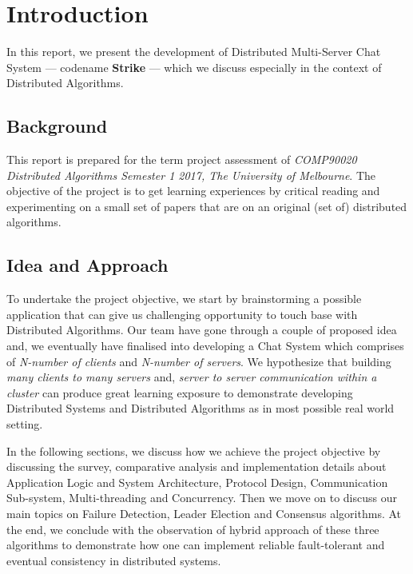 \documentclass[dareport.tex]{subfiles}
\begin{document}

\section{Introduction}
In this report, we present the development of Distributed Multi-Server Chat System --- codename \textbf{Strike} --- which we discuss especially in the context of Distributed Algorithms.

\subsection{Background}
This report is prepared for the term project assessment of \textit{COMP90020 Distributed Algorithms Semester 1 2017, The University of Melbourne}. The objective of the project is to get learning experiences by critical reading and experimenting on a small set of papers that are on an original (set of) distributed algorithms.

\subsection{Idea and Approach}
To undertake the project objective, we start by brainstorming a possible application that can give us challenging opportunity to touch base with Distributed Algorithms. Our team have gone through a couple of proposed idea and, we eventually have finalised into developing a Chat System which comprises of \emph{N-number of clients} and \emph{N-number of servers}. We hypothesize that building \emph{many clients to many servers} and, \emph{server to server communication within a cluster} can produce great learning exposure to demonstrate developing Distributed Systems and Distributed Algorithms as in most possible real world setting.

In the following sections, we discuss how we achieve the project objective by discussing the survey, comparative analysis and implementation details about Application Logic and System Architecture, Protocol Design, Communication Sub-system, Multi-threading and Concurrency. Then we move on to discuss our main topics on Failure Detection, Leader Election and Consensus algorithms. At the end, we conclude with the observation of hybrid approach of these three algorithms to demonstrate how one can implement reliable fault-tolerant and eventual consistency in distributed systems.
\end{document}
